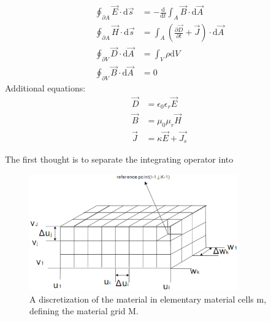 \begin{align}
\oint_{\partial A}\vec{E}\cdot\mathrm{d}\vec{s}&=
-\frac{\mathrm{d}}{\mathrm{d}t}\int_{A}\vec{B}\cdot\mathrm{d}\vec{A}
\label{eq:maxwell_1}\\
\oint_{\partial A}\vec{H}\cdot\mathrm{d}\vec{s}&=
\int_{A}(\frac{\partial\vec{D}}{\partial t}+\vec{J})\cdot\mathrm{d}\vec{A}
\label{eq:maxwell_2}\\
\oint_{\partial V}\vec{D}\cdot\mathrm{d}\vec{A}&=
\int_{V}\rho\mathrm{d}V
\label{eq:maxwell_3}\\
\oint_{\partial V}\vec{B}\cdot\mathrm{d}\vec{A}&=0
\label{eq:maxwell_4}
\end{align}
Additional equations:
\begin{align}
\vec{D}&=\epsilon_{0}\epsilon_{r}\vec{E}
\label{eq:maxwell_5}\\
\vec{B}&=\mu_{0}\mu_{r}\vec{H}
\label{eq:maxwell_6}\\
\vec{J}&=\kappa\vec{E}+\vec{J_{s}}
\label{eq:maxwell_7}
\end{align}

The first thought is to separate the integrating operator into 


\begin{figure}
\includegraphics[width=0.8\textwidth]{bilder/grid_volum}
\caption{A discretization of the material in elementary material cells m, defining the material grid M.}
\label{fig:discretization_material}
\end{figure}


